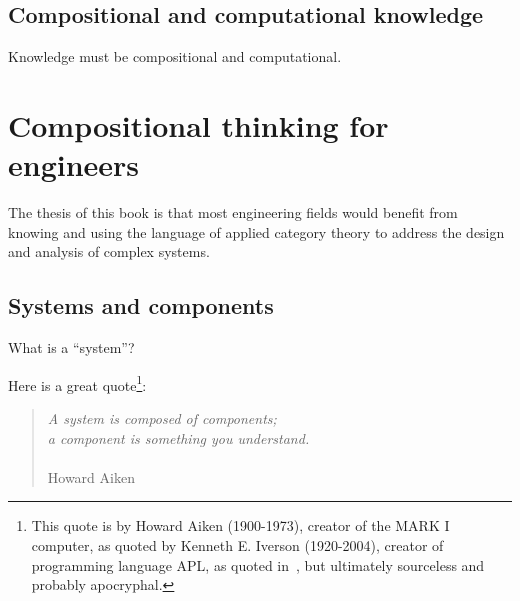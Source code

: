 %
%

\subsection{Compositional and computational knowledge}

Knowledge must be compositional and computational.

\section[Compositionality for engineers]{Compositional thinking for engineers}
\label{sec:compositionality-for-engineers}

The thesis of this book is that most engineering fields would benefit from knowing and using the language of applied category theory to address the design and analysis of complex systems.

\subsection{Systems and components}

\label{subsec:introduction-systems-and-components}

What is a ``system''?

Here is a great quote\footnote{
    This quote is by Howard Aiken (1900-1973), creator of the MARK I computer,
    as quoted by Kenneth E.
    Iverson (1920-2004), creator of programming language APL,
    as quoted in~\cite{McIntyre1999Role}, but ultimately sourceless and probably apocryphal.
}:

\begin{quote}
    \emph{A system is composed of components;  \\
    a component is something you understand.}\\
    \\
    Howard Aiken
\end{quote}

